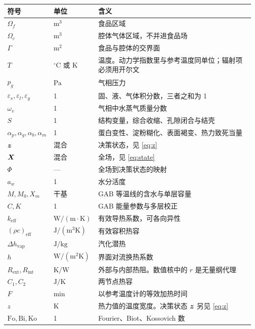 \begin{table}[htbp]
{\begin{tabular}{@{}l l p{3.7cm}@{}}
\toprule
符号 & 单位 & 含义 \\
\midrule
\(\Omega_f\) & \(\mathrm{m}^3\) & 食品区域 \\
\(\Omega_c\) & \(\mathrm{m}^3\) & 腔体气体区域，不并进食品场 \\
\(\Gamma\) & \(\mathrm{m}^2\) & 食品与腔体的交界面 \\
\(T\) & \(^\circ\mathrm{C}\) 或 \(\mathrm{K}\) & 温度。动力学指数里与参考温度同单位；辐射项必须用开尔文 \\
\(p_g\) & \(\mathrm{Pa}\) & 气相压力 \\
\(\varepsilon_s,\varepsilon_l,\varepsilon_g\) & 1 & 固、液、气体积分数，三者之和为 1 \\
\(\omega_v\) & 1 & 气相中水蒸气质量分数 \\
\(S\) & 1 & 结构变量，综合收缩、孔隙闭合与结壳 \\
\(\alpha_p,\alpha_g,\alpha_b,\alpha_m\) & 1 & 蛋白变性、淀粉糊化、表面褐变、热力致死当量 \\
\(\bm{z}\) & 混合 & 决策状态，见 \eqref{eq:z} \\
\(\bm{X}\) & 混合 & 全场，见 \eqref{eq:state} \\
\(\Phi\) & — & 全场到决策状态的映射 \\
\(a_w\) & 1 & 水分活度 \\
\(M,M_0,X_m\) & 干基 & GAB 等温线的含水与单层容量 \\
\(C,K\) & 1 & GAB 能量参数与多层校正 \\
\(k_{\mathrm{eff}}\) & \(\mathrm{W}/(\mathrm{m\cdot K})\) & 有效导热系数，可各向异性 \\
\((\rho c)_{\mathrm{eff}}\) & \(\mathrm{J}/(\mathrm{m}^3\mathrm{K})\) & 有效容积热容 \\
\(\Delta h_{\mathrm{vap}}\) & \(\mathrm{J}/\mathrm{kg}\) & 汽化潜热 \\
\(h\) & \(\mathrm{W}/(\mathrm{m}^2\mathrm{K})\) & 界面对流换热系数 \\
\(R_{\mathrm{ext}},R_{\mathrm{int}}\) & \(\mathrm{K}/\mathrm{W}\) & 外部与内部热阻。数值核中的 \(r\) 是无量纲代理 \\
\(C_1,C_2\) & \(\mathrm{J}/\mathrm{K}\) & 两节点热容 \\
\(F\) & \(\mathrm{min}\) & 以参考温度计的等效加热时间 \\
\(z\) & \(\mathrm{K}\) & 热力值的温度宽度。决策状态 \(\bm{z}\) 另见 \eqref{eq:z} \\
\(\mathrm{Fo},\mathrm{Bi},\mathrm{Ko}\) & 1 & Fourier、Biot、Kossovich 数 \\
\bottomrule
\end{tabular}}
\end{table}


